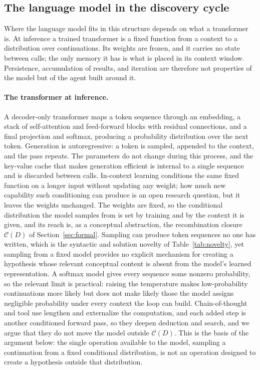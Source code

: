 \documentclass[11pt]{article}
\begin{document}
\subsection{The language model in the discovery cycle}
\label{sec:inference-loop}

Where the language model fits in this structure depends on what a transformer is. At
inference a trained transformer is a fixed function from a context to a distribution over
continuations. Its weights are frozen, and it carries no state between calls; the only memory it has is
what is placed in its context window. Persistence, accumulation of results, and iteration are therefore
not properties of the model but of the agent built around it.

\paragraph{The transformer at inference.} A decoder-only transformer maps a token sequence through an
embedding, a stack of self-attention and feed-forward blocks with residual connections, and a final
projection and softmax, producing a probability distribution over the next token. Generation is
autoregressive: a token is sampled, appended to the context, and the pass repeats. The parameters do
not change during this process, and the key-value cache that makes generation efficient is internal to a
single sequence and is discarded between calls. In-context learning conditions the same fixed function
on a longer input without updating any weight; how much new capability such conditioning can produce is
an open research question, but it leaves the weights unchanged. The weights are fixed, so the conditional distribution the model samples
from is set by training and by the context it is given, and its reach is, as a conceptual abstraction,
the recombination closure $\mathcal{C}(D)$ of Section~\ref{sec:formal}. Sampling can produce token
sequences no one has written, which is the syntactic and solution novelty of Table~\ref{tab:novelty},
yet sampling from a fixed model provides no explicit mechanism for creating a hypothesis whose relevant
conceptual content is absent from the model's learned representation. A softmax model gives every
sequence some nonzero probability, so the relevant limit is practical: raising the temperature makes
low-probability continuations more likely but does not make likely those the model assigns negligible
probability under every context the loop can build. Chain-of-thought
and tool use lengthen and externalize the computation, and each added step is another conditioned
forward pass, so they deepen deduction and search, and we argue that they do not move the model outside
$\mathcal{C}(D)$. This is the
basis of the argument below: the single operation available to the model, sampling a continuation from a
fixed conditional distribution, is not an operation designed to create a hypothesis outside that
distribution.
\end{document}
